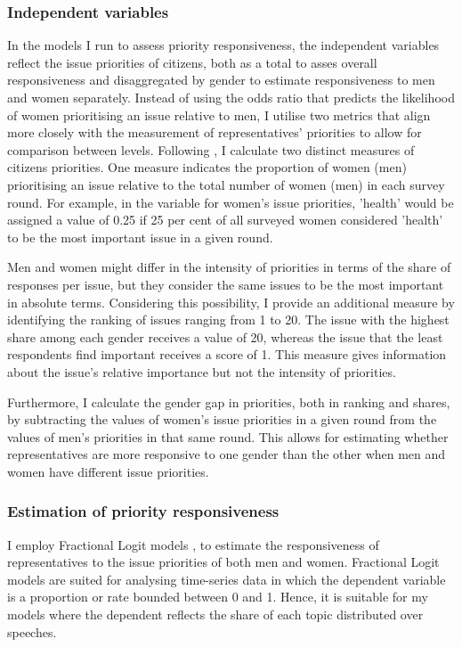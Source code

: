 \subsubsection*{Independent variables}
In the models I run to assess priority responsiveness, the independent variables reflect the issue priorities of citizens, both as a total to asses overall responsiveness and disaggregated by gender to estimate responsiveness to men and women separately. Instead of using the odds ratio that predicts the likelihood of women prioritising an issue relative to men, I utilise two metrics that align more closely with the measurement of representatives' priorities to allow for comparison between levels. Following \textcite{traber_social_2022}, I calculate two distinct measures of citizens priorities. One measure indicates the proportion of women (men) prioritising an issue relative to the total number of women (men) in each survey round. For example, in the variable for women's issue priorities, 'health' would be assigned a value of 0.25 if 25 per cent of all surveyed women considered 'health' to be the most important issue in a given round. 

Men and women might differ in the intensity of priorities in terms of the share of responses per issue, but they consider the same issues to be the most important in absolute terms. Considering this possibility, I provide an additional measure by identifying the ranking of issues ranging from 1 to 20. The issue with the highest share among each gender receives a value of 20, whereas the issue that the least respondents find important receives a score of 1.  This measure gives information about the issue's relative importance but not the intensity of priorities. 

Furthermore, I calculate the gender gap in priorities, both in ranking and shares, by subtracting the values of women's issue priorities in a given round from the values of men's priorities in that same round. This allows for estimating whether representatives are more responsive to one gender than the other when men and women have different issue priorities. 


\subsubsection*{Estimation of priority responsiveness}
I employ Fractional Logit models \textcite{papke_econometric_1996}, to estimate the responsiveness of representatives to the issue priorities of both men and women. Fractional Logit models are suited for analysing time-series data in which the dependent variable is a proportion or rate bounded between 0 and 1. Hence, it is suitable for my models where the dependent reflects the share of each topic distributed over speeches. 

